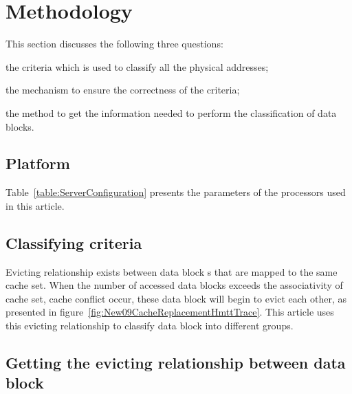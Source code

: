 \documentclass[conference]{IEEEtran}
\newcommand{\WordDataBlock}{data block }
\newcommand{\Associativity}{associativity }
\begin{document}
\section{Methodology}
This section discusses the following three questions: 
\begin{inparaenum}[(1)]
\item the criteria which is used to classify all the physical addresses;
\item the mechanism to ensure the correctness of the criteria;
\item the method to get the information needed to perform the classification of data blocks. 
\end{inparaenum}
\subsection{Platform}
Table~\ref{table:ServerConfiguration} presents the parameters of the processors used in this article.
\subsection{Classifying criteria}
Evicting relationship exists between \WordDataBlock s that are mapped to the same cache set. When the number of accessed data blocks exceeds the associativity of cache set, cache conflict occur, these \WordDataBlock will begin to evict each other, as presented in figure~\ref{fig:New09CacheReplacementHmttTrace}. This article uses this evicting relationship to classify \WordDataBlock into different groups. 
\subsection{Getting the evicting relationship between \WordDataBlock}
\end{document}
